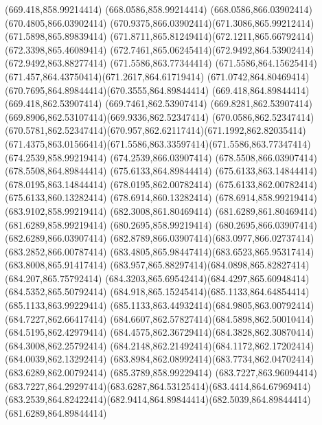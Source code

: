 {{	\lineto(669.418,858.99214414)
	\lineto(668.0586,858.99214414)
	\lineto(668.0586,866.03902414)
	\lineto(670.4805,866.03902414)
	\curveto(670.9375,866.03902414)(671.3086,865.99212414)(671.5898,865.89839414)
	\curveto(671.8711,865.81249414)(672.1211,865.66792414)(672.3398,865.46089414)
	\curveto(672.7461,865.06245414)(672.9492,864.53902414)(672.9492,863.88277414)
	\closepath
	\moveto(671.5586,863.77344414)
	\curveto(671.5586,864.15625414)(671.457,864.43750414)(671.2617,864.61719414)
	\curveto(671.0742,864.80469414)(670.7695,864.89844414)(670.3555,864.89844414)
	\lineto(669.418,864.89844414)
	\lineto(669.418,862.53907414)
	\lineto(669.7461,862.53907414)
	\curveto(669.8281,862.53907414)(669.8906,862.53107414)(669.9336,862.52347414)
	\lineto(670.0586,862.52347414)
	\curveto(670.5781,862.52347414)(670.957,862.62117414)(671.1992,862.82035414)
	\curveto(671.4375,863.01566414)(671.5586,863.33597414)(671.5586,863.77347414)
	\closepath
	\moveto(674.2539,858.99219414)
	\lineto(674.2539,866.03907414)
	\lineto(678.5508,866.03907414)
	\lineto(678.5508,864.89844414)
	\lineto(675.6133,864.89844414)
	\lineto(675.6133,863.14844414)
	\lineto(678.0195,863.14844414)
	\lineto(678.0195,862.00782414)
	\lineto(675.6133,862.00782414)
	\lineto(675.6133,860.13282414)
	\lineto(678.6914,860.13282414)
	\lineto(678.6914,858.99219414)
	\closepath
	\moveto(683.9102,858.99219414)
	\lineto(682.3008,861.80469414)
	\lineto(681.6289,861.80469414)
	\lineto(681.6289,858.99219414)
	\lineto(680.2695,858.99219414)
	\lineto(680.2695,866.03907414)
	\lineto(682.6289,866.03907414)
	\curveto(682.8789,866.03907414)(683.0977,866.02737414)(683.2852,866.00787414)
	\curveto(683.4805,865.98447414)(683.6523,865.95317414)(683.8008,865.91417414)
	\curveto(683.957,865.88297414)(684.0898,865.82827414)(684.207,865.75792414)
	\curveto(684.3203,865.69542414)(684.4297,865.60948414)(684.5352,865.50792414)
	\curveto(684.918,865.15245414)(685.1133,864.64854414)(685.1133,863.99229414)
	\curveto(685.1133,863.44932414)(684.9805,863.00792414)(684.7227,862.66417414)
	\curveto(684.6607,862.57827414)(684.5898,862.50010414)(684.5195,862.42979414)
	\curveto(684.4575,862.36729414)(684.3828,862.30870414)(684.3008,862.25792414)
	\curveto(684.2148,862.21492414)(684.1172,862.17202414)(684.0039,862.13292414)
	\curveto(683.8984,862.08992414)(683.7734,862.04702414)(683.6289,862.00792414)
	\lineto(685.3789,858.99229414)
	\closepath
	\moveto(683.7227,863.96094414)
	\curveto(683.7227,864.29297414)(683.6287,864.53125414)(683.4414,864.67969414)
	\curveto(683.2539,864.82422414)(682.9414,864.89844414)(682.5039,864.89844414)
	\lineto(681.6289,864.89844414)
}}
